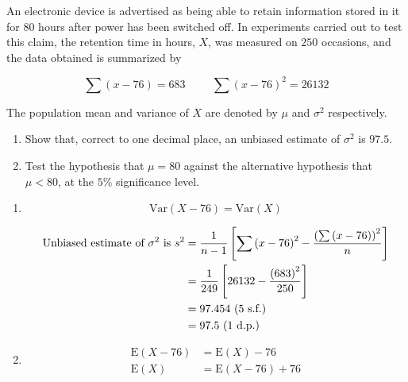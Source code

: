 \documentclass[11pt,a4paper]{book}
\begin{document}
\newpage

\begin{example}

An electronic device is advertised as being able to retain information
stored in it for $80$ hours after power has been switched off. In
experiments carried out to test this claim, the retention time in
hours, $X$, was measured on $250$ occasions, and the data obtained
is summarized by

\[
\sum\left(x-76\right)=683\hspace{1cm}\sum\left(x-76\right)^{2}=26132
\]

The population mean and variance of $X$ are denoted by $\mu$ and
$\sigma^{2}$ respectively.

\begin{enumerate}[label=(\alph*)]

\item  Show that, correct to one decimal place, an unbiased estimate
of $\sigma^{2}$ is $97.5$.

\item  Test the hypothesis that $\mu=80$ against the alternative
hypothesis that $\mu<80$, at the $5\%$ significance level.

\end{enumerate}

\Solution

\begin{enumerate}[label=(\alph*)]

\item

\[
\text{Var}\left(X-76\right)=\text{Var}\left(X\right)
\]

\begin{align*}
\text{Unbiased estimate of \ensuremath{\sigma^{2}} is }s^{2} & =\frac{1}{n-1}\left[\sum\left(x-76\right)^{2}-\frac{\left(\sum\left(x-76\right)\right)^{2}}{n}\right]\\
 & =\frac{1}{249}\left[26132-\frac{\left(683\right)^{2}}{250}\right]\\
 & =97.454\text{ (5 s.f.)}\\
 & =97.5\text{ (1 d.p.)}
\end{align*}

\item

\begin{align*}
\text{E}\left(X-76\right) & =\text{E}\left(X\right)-76\\
\text{E}\left(X\right) & =\text{E}\left(X-76\right)+76
\end{align*}


\end{enumerate}
\end{example}
\end{document}

